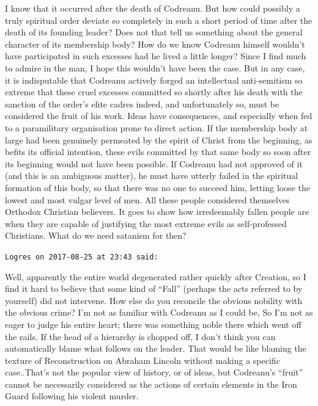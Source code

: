 \begin{footnotesize}
\begin{sffamily}
I know that it occurred after the death of Codreanu. But how could possibly a truly spiritual order deviate so completely in such a short period of time after the death of its founding leader? Does not that tell us something about the general character of its membership body? How do we know Codreanu himself wouldn't have participated in such excesses had he lived a little longer? Since I find much to admire in the man, I hope this wouldn't have been the case. But in any case, it is indisputable that Codreanu actively forged an intellectual anti-semitism so extreme that these cruel excesses committed so shortly after his death with the sanction of the order's elite cadres indeed, and unfortunately so, must be considered the fruit of his work. Ideas have consequences, and especially when fed to a paramilitary organisation prone to direct action. If the membership body at large had been genuinely permeated by the spirit of Christ from the beginning, as befits its official intention, these evils committed by that same body so soon after its beginning would not have been possible. If Codreanu had not approved of it (and this is an ambiguous matter), he must have utterly failed in the spiritual formation of this body, so that there was no one to succeed him, letting loose the lowest and most vulgar level of men. All these people considered themselves Orthodox Christian believers. It goes to show how irredeemably fallen people are when they are capable of justifying the most extreme evils as self-professed Christians. What do we need satanism for then?

\hfill

\texttt{Logres on 2017-08-25 at 23:43 said:}

Well, apparently the entire world degenerated rather quickly after Creation, so I find it hard to believe that some kind of ``Fall'' (perhaps the acts referred to by yourself) did not intervene. How else do you reconcile the obvious nobility with the obvious crime? I'm not as familiar with Codreanu as I could be, So I'm not as eager to judge his entire heart; there was something noble there which went off the rails. If the head of a hierarchy is chopped off, I don't think you can automatically blame what follows on the leader. That would be like blaming the texture of Reconstruction on Abraham Lincoln without making a specific case..That's not the popular view of history, or of ideas, but Codreanu's ``fruit'' cannot be necessarily considered as the actions of certain elements in the Iron Guard following his violent murder.


\end{sffamily}
\end{footnotesize}
